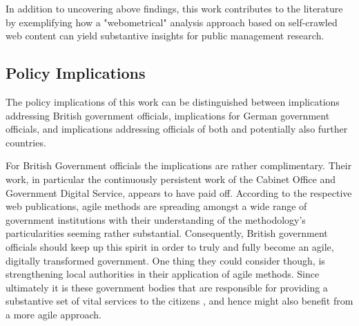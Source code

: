 In addition to uncovering above findings, this work contributes to the literature by exemplifying how a "webometrical" analysis approach \parencite{Thelwall2009} based on self-crawled web content can yield substantive insights for public management research. 

\subsection{Policy Implications}\label{Policy Implications}
The policy implications of this work can be distinguished between implications addressing British government officials, implications for German government officials, and implications addressing officials of both and potentially also further countries.

For British Government officials the implications are rather complimentary. Their work, in particular the continuously persistent work of the Cabinet Office and Government Digital Service, appears to have paid off. According to the respective web publications, agile methods are spreading amongst a wide range of government institutions with their understanding of the methodology's particularities seeming rather substantial. Consequently, British government officials should keep up this spirit in order to truly and fully become an agile, digitally transformed government. One thing they could consider though, is strengthening local authorities in their application of agile methods. Since ultimately it is these government bodies that are responsible for providing a substantive set of vital services to the citizens \parencite{LocalGovernmentAssociation2020}, and hence might also benefit from a more agile approach.


